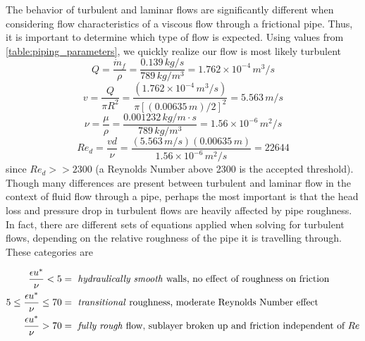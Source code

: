 \documentclass[9pt]{article} %
\numberwithin{equation}{section} %
\begin{document}
The behavior of turbulent and laminar flows are significantly different when considering flow characteristics of a viscous flow through a frictional pipe. Thus, it is important to determine which type of flow is expected. Using values from \ref{table:piping_parameters}, we quickly realize our flow is most likely turbulent
\begin{equation} \label{eq:pipe_fluid_volumetric_flow_rate}
Q = \frac{\dot{m}_{f}}{\rho} = \frac{0.139\, kg/s}{789\, kg/m^{3}} = 1.762 \times 10^{-4}\, m^{3}/s
\end{equation}
\begin{equation} \label{eq:pipe_fluid_velocity}
v = \frac{Q}{\pi R^{2}} = \frac{(1.762 \times 10^{-4}\, m^{3}/s)}{\pi [(0.00635\, m) / 2]^{2}} = 5.563\, m/s
\end{equation}
\begin{equation} \label{eq:pipe_fluid_kinematic_viscosity}
\nu = \frac{\mu}{\rho} = \frac{0.001232\, kg/m \cdot s}{789\, kg/m^{3}} = 1.56 \times 10^{-6}\, m^{2}/s
\end{equation}
\begin{equation} \label{eq:pipe_fluid_reynolds}
Re_{d} = \frac{v d}{\nu} = \frac{(5.563\, m/s)(0.00635\, m)}{1.56 \times 10^{-6}\, m^{2}/s} = 22644
\end{equation}
since $Re_{d} >> 2300$ (a Reynolds Number above 2300 is the accepted threshold). Though many differences are present between turbulent and laminar flow in the context of fluid flow through a pipe, perhaps the most important is that the head loss and pressure drop in turbulent flows are heavily affected by pipe roughness. In fact, there are different sets of equations applied when solving for turbulent flows, depending on the relative roughness of the pipe it is travelling through. These categories are \cite{fluid-mechanics}

\begin{align*}
\frac{\epsilon u^{*}}{\nu} < 5 &= \text{ \textit{hydraulically smooth} walls, no effect of roughness on friction} \\
5 \leq \frac{\epsilon u^{*}}{\nu} \leq 70 &= \text{ \textit{transitional} roughness, moderate Reynolds Number effect} \\
\frac{\epsilon u^{*}}{\nu} > 70 &= \text{ \textit{fully rough} flow, sublayer broken up and friction independent of } Re
\end{align*}
\end{document}
